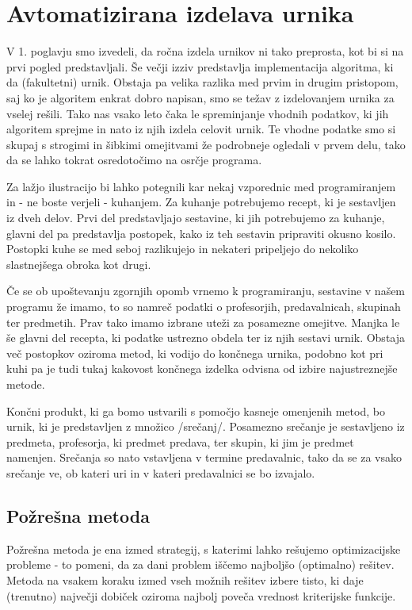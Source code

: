 \documentclass[a4paper]{article}
\begin{document}
\section{Avtomatizirana izdelava urnika} %

V 1. poglavju smo izvedeli, da ročna izdela urnikov ni tako preprosta, kot bi si
na prvi pogled predstavljali. Še večji izziv predstavlja implementacija algoritma, ki da
(fakultetni) urnik. Obstaja pa velika razlika med prvim in drugim pristopom, saj ko je
algoritem enkrat dobro napisan, smo se težav z izdelovanjem urnika za vselej rešili.
Tako nas vsako leto čaka le spreminjanje vhodnih podatkov, ki jih algoritem sprejme in
nato iz njih izdela celovit urnik. Te vhodne podatke smo si skupaj s strogimi in šibkimi
omejitvami že podrobneje ogledali v prvem delu, tako da se lahko tokrat osredotočimo na
osrčje programa.

Za lažjo ilustracijo bi lahko potegnili kar nekaj vzporednic med programiranjem in - ne
boste verjeli - kuhanjem. Za kuhanje potrebujemo recept, ki je sestavljen iz dveh delov.
Prvi del predstavljajo sestavine, ki jih potrebujemo za kuhanje, glavni del pa predstavlja
postopek, kako iz teh sestavin pripraviti okusno kosilo. Postopki kuhe se med seboj
razlikujejo in nekateri pripeljejo do nekoliko slastnejšega obroka kot drugi.

Če se ob upoštevanju zgornjih opomb vrnemo k programiranju, sestavine v našem programu že
imamo, to so namreč podatki o profesorjih, predavalnicah, skupinah ter predmetih. Prav tako
imamo izbrane uteži za posamezne omejitve. Manjka le še glavni del recepta, ki podatke
ustrezno obdela ter iz njih sestavi urnik. Obstaja več postopkov oziroma metod, ki vodijo
do končnega urnika, podobno kot pri kuhi pa je tudi tukaj kakovost končnega izdelka odvisna
od izbire najustreznejše metode.

Končni produkt, ki ga bomo ustvarili s pomočjo kasneje omenjenih metod, bo urnik, ki je
predstavljen z množico /srečanj/. Posamezno srečanje je sestavljeno iz predmeta,
profesorja, ki predmet predava, ter skupin, ki jim je predmet namenjen. Srečanja so nato
vstavljena v termine predavalnic, tako da se za vsako srečanje ve, ob kateri uri in v
kateri predavalnici se bo izvajalo.

\subsection{Požrešna metoda} %

Požrešna metoda je ena izmed strategij, s katerimi lahko rešujemo optimizacijske probleme -
to pomeni, da za dani problem iščemo najboljšo (optimalno) rešitev. Metoda na vsakem koraku
izmed vseh možnih rešitev izbere  tisto, ki daje (trenutno) največji dobiček oziroma najbolj
poveča vrednost kriterijske funkcije.
\end{document}
